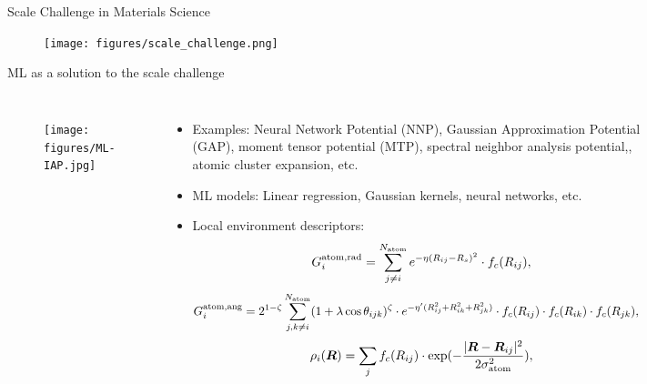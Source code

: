 \documentclass[aspectratio=169]{beamer}
\begin{document}
    \begin{frame}{Scale Challenge in Materials Science}
        \begin{figure}
            \centering
            \texttt{[image: figures/scale\_challenge.png]}
        \end{figure}
    \end{frame}


    \begin{frame}{ML as a solution to the scale challenge}
        \begin{columns}
            \begin{figure}
                \centering
                \texttt{[image: figures/ML-IAP.jpg]}
            \end{figure}
            \begin{itemize}
                \small
                \item Examples: Neural Network Potential (NNP)\cite{behlerHighDimensionalNeuralNetwork}, Gaussian Approximation Potential (GAP)\cite{bartokGaussianApproximationPotentials2010}, moment tensor potential (MTP)\cite{novikovMLIPPackageMoment2021}, spectral neighbor analysis potential,\cite{thompsonSpectralNeighborAnalysis2015}, atomic cluster expansion\cite{drautzAtomicClusterExpansion2020}, etc.
                \item ML models: Linear regression, Gaussian kernels, neural networks, etc.
                \item Local environment descriptors:
                \tiny{
                    \begin{equation*}
                        G_{i}^{\rm atom, \rm rad} = \sum_{j\neq i}^{N_{\rm atom}} e^{-\eta(R_{ij}-R_{s})^{2}} \cdot f_{c}(R_{ij}),
                    \end{equation*}
                    \begin{equation*}
                        \begin{split}
                            G_{i}^{\rm atom, \rm ang}&=2^{1-\zeta}\sum_{j,k \neq i}^{N_{\rm atom}} (1 + \lambda \cos \theta_{ijk})^{\zeta} \cdot e^{-\eta^{\prime}(R_{ij}^{2}+R_{ik}^{2}+R_{jk}^{2})}
                            \cdot f_{c}(R_{ij}) \cdot f_{c}(R_{ik}) \cdot f_{c}(R_{jk}),
                        \end{split}
                    \end{equation*}}
                \begin{equation*}
                    \rho_{i}(\boldsymbol{R}) = \sum_{j} f_{c}(R_{ij}) \cdot \exp(-\frac{|\boldsymbol{R} - \boldsymbol{R}_{ij}|^{2}}{2\sigma_{\rm atom}^{2}}),
                \end{equation*}

            \end{itemize}
        \end{columns}

    \end{frame}
\end{document}
